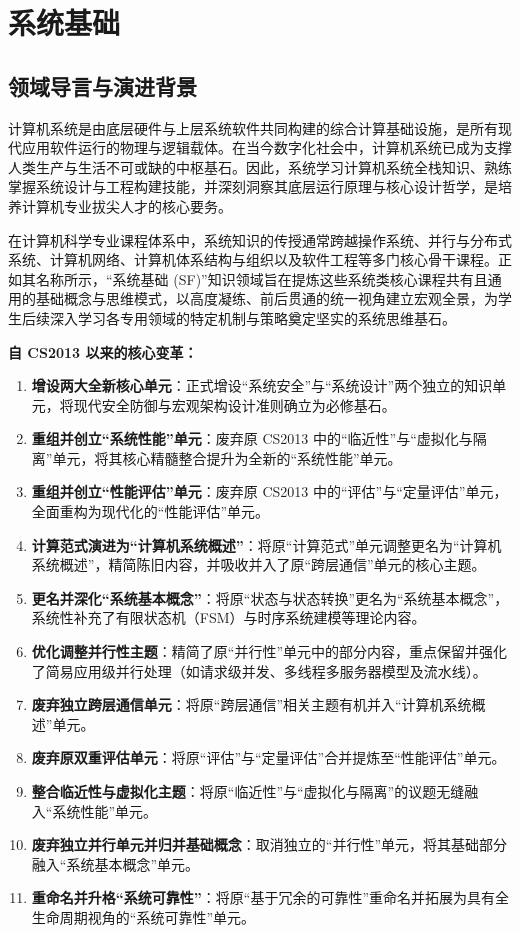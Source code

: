 \chapter{系统基础}

\section{领域导言与演进背景}

\begin{preamblebox}[知识领域概述与变革]
计算机系统是由底层硬件与上层系统软件共同构建的综合计算基础设施，是所有现代应用软件运行的物理与逻辑载体。在当今数字化社会中，计算机系统已成为支撑人类生产与生活不可或缺的中枢基石。因此，系统学习计算机系统全栈知识、熟练掌握系统设计与工程构建技能，并深刻洞察其底层运行原理与核心设计哲学，是培养计算机专业拔尖人才的核心要务。

在计算机科学专业课程体系中，系统知识的传授通常跨越操作系统、并行与分布式系统、计算机网络、计算机体系结构与组织以及软件工程等多门核心骨干课程。正如其名称所示，“系统基础 (SF)”知识领域旨在提炼这些系统类核心课程共有且通用的基础概念与思维模式，以高度凝练、前后贯通的统一视角建立宏观全景，为学生后续深入学习各专用领域的特定机制与策略奠定坚实的系统思维基石。

\textbf{自 CS2013 以来的核心变革：}
\begin{enumerate}
    \item \textbf{增设两大全新核心单元}：正式增设“系统安全”与“系统设计”两个独立的知识单元，将现代安全防御与宏观架构设计准则确立为必修基石。
    \item \textbf{重组并创立“系统性能”单元}：废弃原 CS2013 中的“临近性”与“虚拟化与隔离”单元，将其核心精髓整合提升为全新的“系统性能”单元。
    \item \textbf{重组并创立“性能评估”单元}：废弃原 CS2013 中的“评估”与“定量评估”单元，全面重构为现代化的“性能评估”单元。
    \item \textbf{计算范式演进为“计算机系统概述”}：将原“计算范式”单元调整更名为“计算机系统概述”，精简陈旧内容，并吸收并入了原“跨层通信”单元的核心主题。
    \item \textbf{更名并深化“系统基本概念”}：将原“状态与状态转换”更名为“系统基本概念”，系统性补充了有限状态机（FSM）与时序系统建模等理论内容。
    \item \textbf{优化调整并行性主题}：精简了原“并行性”单元中的部分内容，重点保留并强化了简易应用级并行处理（如请求级并发、多线程多服务器模型及流水线）。
    \item \textbf{废弃独立跨层通信单元}：将原“跨层通信”相关主题有机并入“计算机系统概述”单元。
    \item \textbf{废弃原双重评估单元}：将原“评估”与“定量评估”合并提炼至“性能评估”单元。
    \item \textbf{整合临近性与虚拟化主题}：将原“临近性”与“虚拟化与隔离”的议题无缝融入“系统性能”单元。
    \item \textbf{废弃独立并行单元并归并基础概念}：取消独立的“并行性”单元，将其基础部分融入“系统基本概念”单元。
    \item \textbf{重命名并升格“系统可靠性”}：将原“基于冗余的可靠性”重命名并拓展为具有全生命周期视角的“系统可靠性”单元。
\end{enumerate}
\end{preamblebox}

